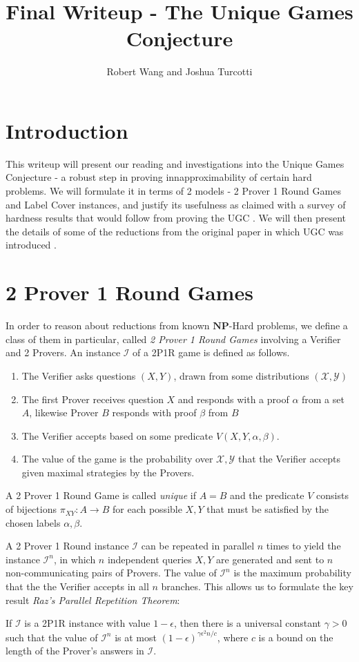 \documentclass{article}
\title{Final Writeup - The Unique Games Conjecture}
\author{Robert Wang and Joshua Turcotti}
\newcommand{\NP}{\ensuremath{\mathbf{NP}}}
\newcommand{\X}{\mathcal{X}}
\newcommand{\Y}{\mathcal{Y}}
\renewcommand{\a}{\alpha}
\renewcommand{\b}{\beta}
\newcommand{\g}{\gamma}
\newcommand{\e}{\epsilon}
\newcommand{\I}{\mathcal{I}}
\newcommand{\1}{\mathbbm{1}}
\begin{document}
\maketitle
\section*{Introduction}

This writeup will present our reading and investigations into the Unique Games Conjecture - a robust step in proving innapproximability of certain hard problems. We will formulate it in terms of 2 models - 2 Prover 1 Round Games and Label Cover instances, and justify its usefulness as claimed with a survey of hardness results that would follow from proving the UGC \cite{1530695}. We will then present the details of some of the reductions from the original paper in which UGC was introduced \cite{Khot02onthe}. 

\section*{2 Prover 1 Round Games}


In order to reason about reductions from known \NP-Hard problems, we define a class of them in particular, called \textit{2 Prover 1 Round Games} involving a Verifier and 2 Provers. An instance $\I$ of a 2P1R game is defined as follows.
\begin{enumerate}
\item The Verifier asks questions $(X, Y)$, drawn from some distributions $(\X, \Y)$
\item The first Prover receives question $X$ and responds with a proof $\alpha$ from a set $A$, likewise Prover $B$ responds with proof $\beta$ from $B$
\item The Verifier accepts based on some predicate $V(X, Y, \alpha, \beta)$.
\item The value of the game is the probability over $\X, \Y$ that the Verifier accepts given maximal strategies by the Provers.
\end{enumerate}
A 2 Prover 1 Round Game is called \textit{unique} if $A = B$ and the predicate $V$ consists of bijections $\pi_{XY}: A \to B$ for each possible $X, Y$ that must be satisfied by the chosen labels $\a, \b$.



A 2 Prover 1 Round instance $\I$ can be repeated in parallel $n$ times to yield the instance $\I^n$, in which $n$ independent queries $X, Y$ are generated and sent to $n$ non-communicating pairs of Provers. The value of $\I^n$ is the maximum probability that the the Verifier accepts in all $n$ branches. This allows us to formulate the key result \textit{Raz's Parallel Repetition Theorem}:
\begin{theorem}
  If $\I$ is a 2P1R instance with value $1 - \e$, then there is a universal constant $\g > 0$ such that the value of $\I^n$ is at most $(1 - \e)^{\g \e^2 n/c}$, where $c$ is a bound on the length of the Prover's answers in $\I$.
\end{theorem}
\end{document}
